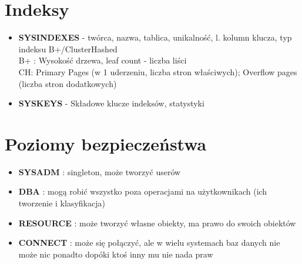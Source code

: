 \documentclass[a4paper,twoside]{article}
\begin{document}
  	\section*{Indeksy}
  	\begin{itemize}
  		\item \textbf{SYSINDEXES} - twórca, nazwa, tablica, unikalność, l. kolumn klucza, typ indeksu B+/ClusterHashed\\
  		B+ : Wysokość drzewa, leaf count - liczba liści\\
  		CH:  Primary Pages (w 1 uderzeniu, liczba stron właściwych); Overflow pages (liczba stron dodatkowych)
  		\item \textbf{SYSKEYS} - Składowe klucze indeksów, statystyki
  	\end{itemize}
  	\section*{Poziomy bezpieczeństwa}
  	\begin{itemize}
  		\item \textbf{SYSADM} : singleton, może tworzyć userów
  		\item \textbf{DBA} : mogą robić wszystko poza operacjami na użytkownikach (ich tworzenie i klasyfikacja)
  		\item \textbf{RESOURCE} : może tworzyć własne obiekty, ma prawo do swoich obiektów
  		\item \textbf{CONNECT} : może się połączyć, ale w wielu systemach baz danych nie może nic ponadto dopóki ktoś inny mu nie nada praw
  	\end{itemize}
\end{document}
